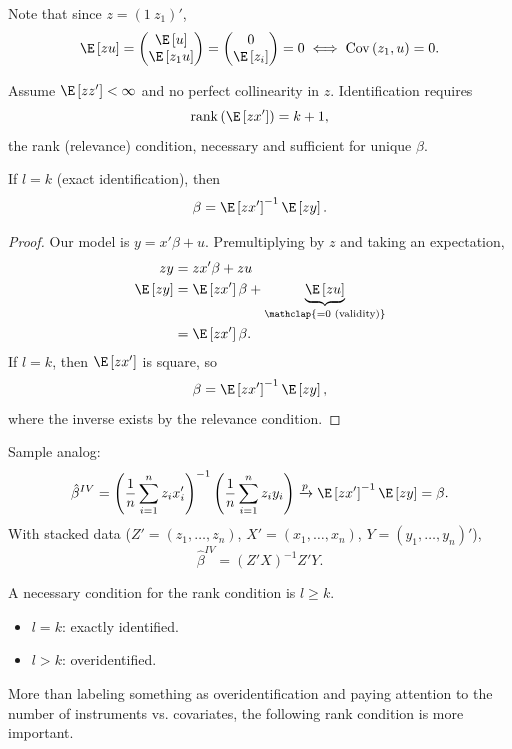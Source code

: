 Note that since $z = (1 \ z_1)'$, \[
		\E\left[zu\right] = \begin{pmatrix}
		\E\left[u\right]  \\
		\E\left[z_1 u\right] 
		\end{pmatrix} = \begin{pmatrix}
		0 \\
		\E\left[z_i\right] 
		\end{pmatrix} = 0 \iff \operatorname{Cov}\left(z_1,u\right) = 0
	.\] 

\begin{proposition}
	Assume $\E\left[zz'\right]<\infty$ and no perfect collinearity in $z$. Identification requires \[
		\operatorname{rank}\left(\E\left[zx'\right]\right)=k+1
	,\]
	the rank (relevance) condition, necessary and sufficient for unique $\beta$.

	If $l=k$ (exact identification), then \[
		\beta = \E\left[zx'\right]^{-1}\E\left[zy\right]
	.\]
\end{proposition}
\begin{proof}
	Our model is $y = x'\beta + u$. Premultiplying by $z$ and taking an expectation,
	\begin{align*}
		zy &= zx' \beta + zu \\
		\E\left[zy\right] &= \E\left[zx'\right] \beta + \underbrace{\E\left[zu\right] }_{\mathclap{=0 \text{ (validity)}}} \\
						  &= \E\left[zx'\right] \beta
	.\end{align*}
	If $l=k$, then $\E\left[zx'\right]$ is square, so \[
		\beta = \E\left[zx'\right] ^{-1} \E\left[zy\right] 
	,\] where the inverse exists by the relevance condition.
\end{proof}

\begin{proposition}[IV estimator when $l=k$]
	Sample analog: \[
		\hat{\beta}^{IV} = \left(\frac{1}{n}\sum_{i=1}^{n} z_i x_i'\right)^{-1}\left(\frac{1}{n}\sum_{i=1}^{n} z_i y_i\right) \xrightarrow{p} \E\left[zx'\right] ^{-1} \E\left[zy\right] = \beta
	.\]
	With stacked data ($Z'=(z_1,\ldots,z_n)$, $X'=(x_1,\ldots,x_n)$, $Y=(y_1,\ldots,y_n)'$), \[
		\hat{\beta}^{IV} = (Z'X)^{-1}Z'Y
	.\]
\end{proposition}

\begin{remark}
	A necessary condition for the rank condition is $l\ge k$.
	\begin{itemize}
		\item $l=k$: exactly identified.
		\item $l>k$: overidentified.
	\end{itemize}
	More than labeling something as overidentification and paying attention to the number of instruments vs. covariates, the following rank condition is more important.
\end{remark}


